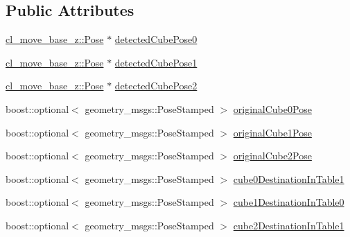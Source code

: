 \subsection*{Public Attributes}
\begin{DoxyCompactItemize}
\item 
\hyperlink{classcl__move__base__z_1_1Pose}{cl\+\_\+move\+\_\+base\+\_\+z\+::\+Pose} $\ast$ \hyperlink{classsm__moveit__3_1_1cl__perception__system_1_1ClPerceptionSystem_a6ac235df679beb12a5b5213bff957440}{detected\+Cube\+Pose0}
\item 
\hyperlink{classcl__move__base__z_1_1Pose}{cl\+\_\+move\+\_\+base\+\_\+z\+::\+Pose} $\ast$ \hyperlink{classsm__moveit__3_1_1cl__perception__system_1_1ClPerceptionSystem_a3f1b847b74fdd45ea377b626a7e8a295}{detected\+Cube\+Pose1}
\item 
\hyperlink{classcl__move__base__z_1_1Pose}{cl\+\_\+move\+\_\+base\+\_\+z\+::\+Pose} $\ast$ \hyperlink{classsm__moveit__3_1_1cl__perception__system_1_1ClPerceptionSystem_a2bda2a7e60579dd9d19c5b9e8a9dd79e}{detected\+Cube\+Pose2}
\item 
boost\+::optional$<$ geometry\+\_\+msgs\+::\+Pose\+Stamped $>$ \hyperlink{classsm__moveit__3_1_1cl__perception__system_1_1ClPerceptionSystem_a296e8dd41bbb35a95d64e1780ab8be3d}{original\+Cube0\+Pose}
\item 
boost\+::optional$<$ geometry\+\_\+msgs\+::\+Pose\+Stamped $>$ \hyperlink{classsm__moveit__3_1_1cl__perception__system_1_1ClPerceptionSystem_aaf71c0201292be01979762e7f893878d}{original\+Cube1\+Pose}
\item 
boost\+::optional$<$ geometry\+\_\+msgs\+::\+Pose\+Stamped $>$ \hyperlink{classsm__moveit__3_1_1cl__perception__system_1_1ClPerceptionSystem_a71df0282435faa5f108c4fb2d846e90f}{original\+Cube2\+Pose}
\item 
boost\+::optional$<$ geometry\+\_\+msgs\+::\+Pose\+Stamped $>$ \hyperlink{classsm__moveit__3_1_1cl__perception__system_1_1ClPerceptionSystem_a56f5be6a474c2825b99cab724d2099a1}{cube0\+Destination\+In\+Table1}
\item 
boost\+::optional$<$ geometry\+\_\+msgs\+::\+Pose\+Stamped $>$ \hyperlink{classsm__moveit__3_1_1cl__perception__system_1_1ClPerceptionSystem_aed05fa8526220f01330d5c2c2c014f71}{cube1\+Destination\+In\+Table0}
\item 
boost\+::optional$<$ geometry\+\_\+msgs\+::\+Pose\+Stamped $>$ \hyperlink{classsm__moveit__3_1_1cl__perception__system_1_1ClPerceptionSystem_a1aae7fcf13de6c6b6c07dd2b595a5538}{cube2\+Destination\+In\+Table1}
\item 

\end{DoxyCompactItemize}
